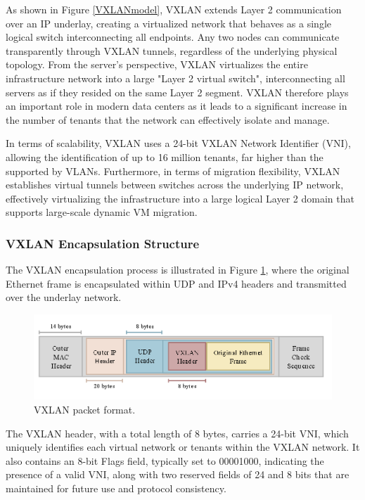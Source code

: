 As shown in Figure \ref{VXLANmodel}, VXLAN extends Layer 2 communication over an IP underlay, creating a virtualized network that behaves as a single logical switch interconnecting all endpoints. Any two nodes can communicate transparently through VXLAN tunnels, regardless of the underlying physical topology. From the server's perspective, VXLAN virtualizes the entire infrastructure network into a large "Layer 2 virtual switch", interconnecting all servers as if they resided on the same Layer 2 segment. VXLAN therefore plays an important role in modern data centers as it leads to a significant increase in the number of tenants that the network can effectively isolate and manage. 

In terms of scalability, VXLAN uses a 24-bit VXLAN Network Identifier (VNI), allowing the identification of up to 16 million tenants, far higher than the supported by VLANs. Furthermore, in terms of migration flexibility, VXLAN establishes virtual tunnels between switches across the underlying IP network, effectively virtualizing the infrastructure into a large logical Layer 2 domain that supports large-scale dynamic VM migration.

\subsubsection{VXLAN Encapsulation Structure}

The VXLAN encapsulation process is illustrated in Figure \ref{VXLANpacket}, where the original Ethernet frame is encapsulated within UDP and IPv4 headers and transmitted over the underlay network.

\begin{figure} [H]
    \centering
    \includegraphics[width=0.65\linewidth]{Figures/VXLANpacket.png}
    \caption{VXLAN packet format. \cite{QSFPtekVXLAN}}
    \label{VXLANpacket}
\end{figure}

The VXLAN header, with a total length of 8 bytes, carries a 24-bit VNI, which uniquely identifies each virtual network or tenants within the VXLAN network. It also contains an 8-bit Flags field, typically set to 00001000, indicating the presence of a valid VNI, along with two reserved fields of 24 and 8 bits that are maintained for future use and protocol consistency.

